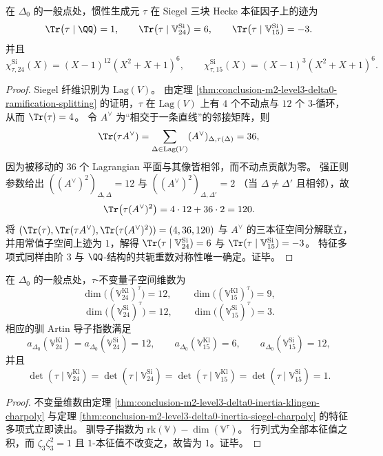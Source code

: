\begin{theorem}\label{thm:conclusion-m2-level3-delta0-inertia-siegel-charpoly}
在 \(\Delta_0\) 的一般点处，惯性生成元 \(\tau\) 在 Siegel 三块 Hecke 本征因子上的迹为
\[
\Tr\bigl(\tau\mid \QQ\bigr)=1,\qquad
\Tr\bigl(\tau\mid \mathbb V_{24}^{\mathrm{Si}}\bigr)=6,\qquad
\Tr\bigl(\tau\mid \mathbb V_{15}^{\mathrm{Si}}\bigr)=-3.
\]
并且
\[
\chi_{\tau,24}^{\mathrm{Si}}(X)=(X-1)^{12}(X^2+X+1)^6,\qquad
\chi_{\tau,15}^{\mathrm{Si}}(X)=(X-1)^{3}(X^2+X+1)^6.
\]
\end{theorem}
\begin{proof}
Siegel 纤维识别为 \(\mathrm{Lag}(V)\)。
由定理 \ref{thm:conclusion-m2-level3-delta0-ramification-splitting} 的证明，\(\tau\) 在 \(\mathrm{Lag}(V)\) 上有 \(4\) 个不动点与 \(12\) 个 \(3\)-循环，从而 \(\Tr(\tau)=4\)。
令 \(A^\vee\) 为“相交于一条直线”的邻接矩阵，则
\[
\Tr(\tau A^\vee)=\sum_{\Delta\in \mathrm{Lag}(V)}(A^\vee)_{\Delta,\tau(\Delta)}=36,
\]
因为被移动的 \(36\) 个 Lagrangian 平面与其像皆相邻，而不动点贡献为零。
强正则参数给出
\(
((A^\vee)^2)_{\Delta,\Delta}=12
\)
与
\(
((A^\vee)^2)_{\Delta,\Delta'}=2
\)
（当 \(\Delta\neq \Delta'\) 且相邻），故
\[
\Tr\bigl(\tau (A^\vee)^2\bigr)=4\cdot 12+36\cdot 2=120.
\]
将 \((\Tr(\tau),\Tr(\tau A^\vee),\Tr(\tau (A^\vee)^2))=(4,36,120)\) 与 \(A^\vee\) 的三本征空间分解联立，并用常值子空间上迹为 \(1\)，解得 \(\Tr(\tau\mid \mathbb V_{24}^{\mathrm{Si}})=6\) 与 \(\Tr(\tau\mid \mathbb V_{15}^{\mathrm{Si}})=-3\)。
特征多项式同样由阶 \(3\) 与 \(\QQ\)-结构的共轭重数对称性唯一确定。证毕。
\end{proof}

\begin{corollary}\label{cor:conclusion-m2-level3-delta0-inertia-invariants-conductor-determinant}
在 \(\Delta_0\) 的一般点处，\(\tau\)-不变量子空间维数为
\[
\dim\bigl((\mathbb V_{24}^{\mathrm{Kl}})^\tau\bigr)=12,\qquad
\dim\bigl((\mathbb V_{15}^{\mathrm{Kl}})^\tau\bigr)=9,
\]
\[
\dim\bigl((\mathbb V_{24}^{\mathrm{Si}})^\tau\bigr)=12,\qquad
\dim\bigl((\mathbb V_{15}^{\mathrm{Si}})^\tau\bigr)=3.
\]
相应的驯 Artin 导子指数满足
\[
a_{\Delta_0}(\mathbb V_{24}^{\mathrm{Kl}})=a_{\Delta_0}(\mathbb V_{24}^{\mathrm{Si}})=12,\qquad
a_{\Delta_0}(\mathbb V_{15}^{\mathrm{Kl}})=6,\qquad
a_{\Delta_0}(\mathbb V_{15}^{\mathrm{Si}})=12,
\]
并且
\[
\det(\tau\mid \mathbb V_{24}^{\mathrm{Kl}})=\det(\tau\mid \mathbb V_{24}^{\mathrm{Si}})
=\det(\tau\mid \mathbb V_{15}^{\mathrm{Kl}})=\det(\tau\mid \mathbb V_{15}^{\mathrm{Si}})=1.
\]
\end{corollary}
\begin{proof}
不变量维数由定理 \ref{thm:conclusion-m2-level3-delta0-inertia-klingen-charpoly} 与定理 \ref{thm:conclusion-m2-level3-delta0-inertia-siegel-charpoly} 的特征多项式立即读出。
驯导子指数为 \(\mathrm{rk}(\mathbb V)-\dim(\mathbb V^\tau)\)。
行列式为全部本征值之积，而 \(\zeta_3\zeta_3^2=1\) 且 \(1\)-本征值不改变之，故皆为 \(1\)。证毕。
\end{proof}

